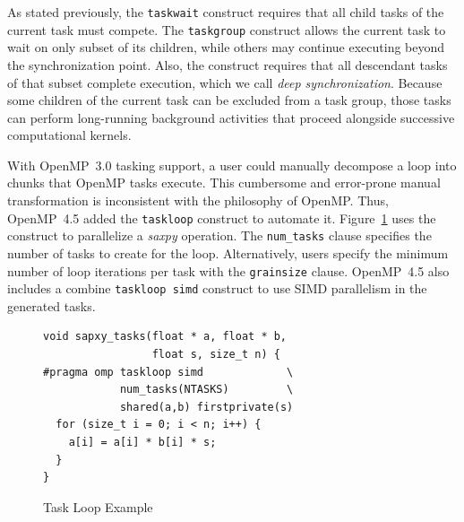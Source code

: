 As stated previously, the \texttt{taskwait} construct requires that all child 
tasks of the current task must compete. The \texttt{taskgroup} construct 
allows the current task to wait on only subset of its children, while others 
may continue executing beyond the synchronization point. Also, the construct
requires that all descendant tasks of that subset complete execution, which
we call \emph{deep synchronization}. Because some children of the current 
task can be excluded from a task group, those tasks can perform long-running 
background activities that proceed alongside successive computational kernels.

\label{sec:Taskloop}
With OpenMP~3.0 tasking support, a user could manually decompose a loop into 
chunks that OpenMP tasks execute. This cumbersome and error-prone manual 
transformation is inconsistent with the philosophy of OpenMP. Thus, OpenMP~4.5
added the \texttt{taskloop} construct to automate it. 
Figure~\ref{fig:TaskloopExample} uses the construct to parallelize a 
\emph{saxpy} operation. The \texttt{num\_tasks} clause specifies the number of 
tasks to create for the loop. Alternatively, users specify the minimum number 
of loop iterations per task with the \texttt{grainsize} clause. OpenMP~4.5
also includes a combine \texttt{taskloop simd} construct to use SIMD 
parallelism in the generated tasks.

\begin{figure}
\begin{verbatim}
void sapxy_tasks(float * a, float * b,
                 float s, size_t n) {
#pragma omp taskloop simd             \
            num_tasks(NTASKS)         \
            shared(a,b) firstprivate(s)
  for (size_t i = 0; i < n; i++) {
    a[i] = a[i] * b[i] * s;
  }
}
\end{verbatim}
\caption{Task Loop Example\label{fig:TaskloopExample}}
\end{figure}
